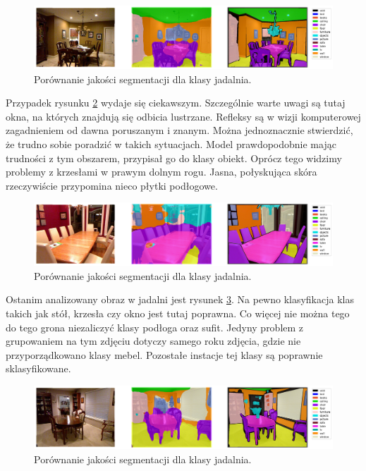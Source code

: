 \begin{figure}[ht!]
    \centering
    \includegraphics[width=\textwidth]{img/preds_analysis/gt_vs_pred/dining_room-1.png}
    \caption{Porównanie jakości segmentacji dla klasy jadalnia.}
    \label{fig:dining_room-pred-1}
\end{figure}

Przypadek rysunku \ref{fig:dining_room-pred-2} wydaje się ciekawszym. Szczególnie warte uwagi są tutaj okna, na których znajdują się odbicia lustrzane. Refleksy są w wizji komputerowej zagadnieniem od dawna poruszanym i znanym. Można jednoznacznie stwierdzić, że trudno sobie poradzić w takich sytuacjach. Model prawdopodobnie mając trudności z tym obszarem, przypisał go do klasy obiekt. Oprócz tego widzimy problemy z krzesłami w prawym dolnym rogu. Jasna, połyskująca skóra rzeczywiście przypomina nieco płytki podłogowe.

\begin{figure}[ht!]
    \centering
    \includegraphics[width=\textwidth]{img/preds_analysis/gt_vs_pred/dining_room-2.png}
    \caption{Porównanie jakości segmentacji dla klasy jadalnia.}
    \label{fig:dining_room-pred-2}
\end{figure}

Ostanim analizowany obraz w jadalni jest rysunek \ref{fig:dining_room-pred-3}. Na pewno klasyfikacja klas takich jak stół, krzesła czy okno jest tutaj poprawna. Co więcej nie można tego do tego grona niezaliczyć klasy podłoga oraz sufit. Jedyny problem z grupowaniem na tym zdjęciu dotyczy samego roku zdjęcia, gdzie nie przyporządkowano klasy mebel. Pozostałe instacje tej klasy są poprawnie sklasyfikowane.

\begin{figure}[ht!]
    \centering
    \includegraphics[width=\textwidth]{img/preds_analysis/gt_vs_pred/dining_room-3.png}
    \caption{Porównanie jakości segmentacji dla klasy jadalnia.}
    \label{fig:dining_room-pred-3}
\end{figure}

